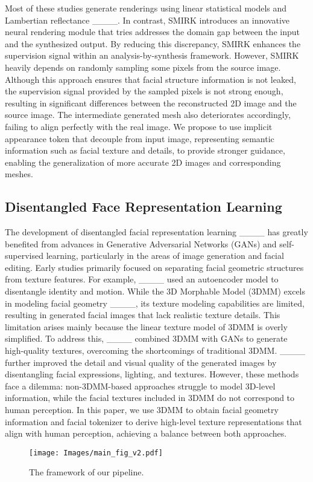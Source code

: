 Most of these studies generate renderings using linear statistical models and Lambertian reflectance ____. In contrast, SMIRK introduces an innovative neural rendering module that tries addresses the domain gap between the input and the synthesized output. By reducing this discrepancy, SMIRK enhances the supervision signal within an analysis-by-synthesis framework. 
However, SMIRK heavily depends on randomly sampling some pixels from the source image. Although this approach ensures that facial structure information is not leaked, the supervision signal provided by the sampled pixels is not strong enough, resulting in significant differences between the reconstructed 2D image and the source image. The intermediate generated mesh also deteriorates accordingly, failing to align perfectly with the real image. We propose to use implicit appearance token that decouple from input image, representing semantic information such as facial texture and details, to provide stronger guidance, enabling the generalization of more accurate 2D images and corresponding meshes.


\subsection{Disentangled Face Representation Learning}
The development of disentangled facial representation learning  ____ has greatly benefited from advances in Generative Adversarial Networks (GANs) and self-supervised learning, particularly in the areas of image generation and facial editing. Early studies primarily focused on separating facial geometric structures from texture features. For example, ____ used an autoencoder model to disentangle identity and motion. While the 3D Morphable Model (3DMM) excels in modeling facial geometry ____, its texture modeling capabilities are limited, resulting in generated facial images that lack realistic texture details. This limitation arises mainly because the linear texture model of 3DMM is overly simplified. To address this, ____ combined 3DMM with GANs to generate high-quality textures, overcoming the shortcomings of traditional 3DMM. ____ further improved the detail and visual quality of the generated images by disentangling facial expressions, lighting, and textures. However, these methods face a dilemma: non-3DMM-based approaches struggle to model 3D-level information, while the facial textures included in 3DMM do not correspond to human perception. In this paper, we use 3DMM to obtain facial geometry information and facial tokenizer to derive high-level texture representations that align with human perception, achieving a balance between both approaches.


\begin{figure}[tp]
\centering
\texttt{[image: Images/main\_fig\_v2.pdf]}
\vspace{-1.5em}
\caption{The framework of our pipeline.}
\vspace{-.5em}
\label{fig:overal_arch}
\end{figure}